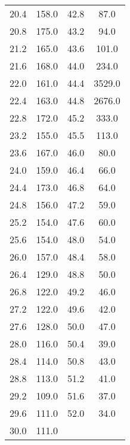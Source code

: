 \begin{table}[H]
\begin{tabular}{S S |S S}
    20.4 & 158.0 & 42.8 & 87.0 \\
    20.8 & 175.0 & 43.2 & 94.0 \\
    21.2 & 165.0 & 43.6 & 101.0 \\
    21.6 & 168.0 & 44.0 & 234.0 \\
    22.0 & 161.0 & 44.4 & 3529.0 \\
    22.4 & 163.0 & 44.8 & 2676.0 \\
    22.8 & 172.0 & 45.2 & 333.0 \\
    23.2 & 155.0 & 45.5 & 113.0 \\
    23.6 & 167.0 & 46.0 & 80.0 \\
    24.0 & 159.0 & 46.4 & 66.0 \\
    24.4 & 173.0 & 46.8 & 64.0 \\
    24.8 & 156.0 & 47.2 & 59.0 \\
    25.2 & 154.0 & 47.6 & 60.0 \\
    25.6 & 154.0 & 48.0 & 54.0 \\
    26.0 & 157.0 & 48.4 & 58.0 \\
    26.4 & 129.0 & 48.8 & 50.0 \\
    26.8 & 122.0 & 49.2 & 46.0 \\
    27.2 & 122.0 & 49.6 & 42.0 \\
    27.6 & 128.0 & 50.0 & 47.0 \\
    28.0 & 116.0 & 50.4 & 39.0 \\
    28.4 & 114.0 & 50.8 & 43.0 \\
    28.8 & 113.0 & 51.2 & 41.0 \\
    29.2 & 109.0 & 51.6 & 37.0 \\
    29.6 & 111.0 & 52.0 & 34.0 \\
    30.0 & 111.0 & & \\
          \bottomrule
        \end{tabular}
    \end{table}
